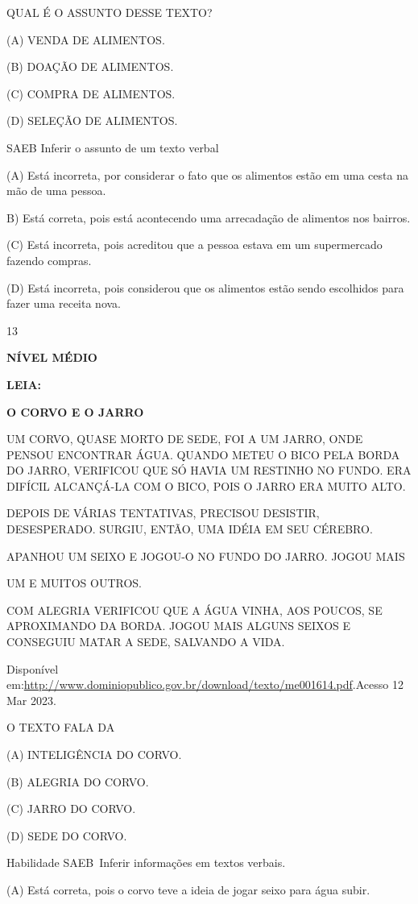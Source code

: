 {{QUAL É O ASSUNTO DESSE TEXTO?

(A) VENDA DE ALIMENTOS.

(B) DOAÇÃO DE ALIMENTOS.

(C) COMPRA DE ALIMENTOS.

(D) SELEÇÃO DE ALIMENTOS.

SAEB Inferir o assunto de um texto verbal

(A) Está incorreta, por considerar o fato que os alimentos estão em uma
cesta na mão de uma pessoa.

B) Está correta, pois está acontecendo uma arrecadação de alimentos nos
bairros.

(C) Está incorreta, pois acreditou que a pessoa estava em um
supermercado fazendo compras.

(D) Está incorreta, pois considerou que os alimentos estão sendo
escolhidos para fazer uma receita nova.

\num{13}

\textbf{NÍVEL MÉDIO}

\textbf{LEIA:}

\textbf{O CORVO E O JARRO}

UM CORVO, QUASE MORTO DE SEDE, FOI A UM JARRO, ONDE PENSOU ENCONTRAR
ÁGUA. QUANDO METEU O BICO PELA BORDA DO JARRO, VERIFICOU QUE SÓ HAVIA UM
RESTINHO NO FUNDO. ERA DIFÍCIL ALCANÇÁ-LA COM O BICO, POIS O JARRO ERA
MUITO ALTO.

DEPOIS DE VÁRIAS TENTATIVAS, PRECISOU DESISTIR, DESESPERADO. SURGIU,
ENTÃO, UMA IDÉIA EM SEU CÉREBRO.

APANHOU UM SEIXO E JOGOU-O NO FUNDO DO JARRO. JOGOU MAIS

UM E MUITOS OUTROS.

COM ALEGRIA VERIFICOU QUE A ÁGUA VINHA, AOS POUCOS, SE APROXIMANDO DA
BORDA. JOGOU MAIS ALGUNS SEIXOS E CONSEGUIU MATAR A SEDE, SALVANDO A
VIDA.

Disponível
em:\url{http://www.dominiopublico.gov.br/download/texto/me001614.pdf}.Acesso
12 Mar 2023.

O TEXTO FALA DA

(A) INTELIGÊNCIA DO CORVO.

(B) ALEGRIA DO CORVO.

(C) JARRO DO CORVO.

(D) SEDE DO CORVO.

Habilidade SAEB~Inferir informações em textos verbais.

\protect\hypertarget{_Hlk129586281}{}{}(\protect\hypertarget{_Hlk129420306}{}{}A)
Está correta, pois o corvo teve a ideia de jogar seixo para água subir.

}}
